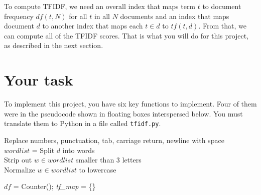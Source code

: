 \begin{fullwidth}
To compute TFIDF, we need an overall index that maps term $t$ to document frequency $df(t,N)$ for all $t$ in all $N$ documents and an index that maps document $d$ to another index that maps each $t \in d$ to $tf(t,d)$. From that, we can compute all of the TFIDF scores.  That is what you will do for this project, as described in the next section.

\section{Your task}

To implement this project, you have six key functions to implement.   Four of them were in the pseudocode shown in  floating boxes interspersed below. You must translate them to Python in a file called {\tt tfidf.py}.

\begin{function}
\vspace{-4pt}
\Indp
 Replace numbers, punctuation, tab, carriage return, newline with space\\
 $wordlist$ = Split $d$ into words\\
 Strip out $w \in wordlist$ smaller than 3 letters\\
 Normalize $w \in wordlist$ to lowercase\\
\end{function}

\begin{function}
\vspace{-4pt}
\Indp
$df$ = Counter(); {\em tf\_map} = \{\}\\
\end{function}


\end{fullwidth}
